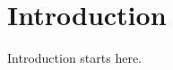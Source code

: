 
\singlespacing
\chapter{Introduction}
\label{ch:intro}
\doublespacing

\pagestyle{fancy}
\chead{}
\cfoot{\thepage}
\renewcommand{\headrulewidth}{0pt} %
\thispagestyle{fancy}

Introduction starts here.

\raggedbottom
\pagebreak

